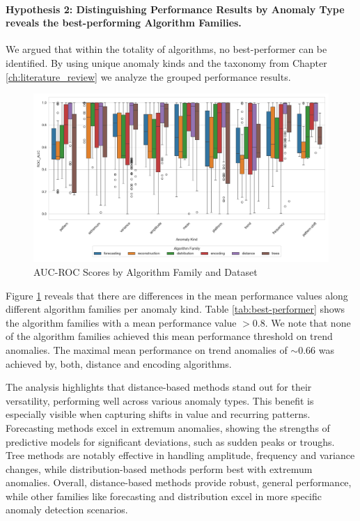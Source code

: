

\paragraph{Hypothesis 2: Distinguishing Performance Results by Anomaly Type reveals the best-performing Algorithm Families.}
We argued that within the totality of algorithms, no best-performer can be identified. By using unique anomaly kinds and the taxonomy from Chapter \ref{ch:literature_review} we analyze the grouped performance results.

\begin{figure}
    \centering
    \includegraphics[width=1\textwidth]{plots/h1_boxplot_results.png}
    \caption{AUC-ROC Scores by Algorithm Family and Dataset}
    \label{fig:h1_boxplot_results}
\end{figure}



Figure \ref{fig:h1_boxplot_results} reveals that there are differences in the mean performance values along different algorithm families per anomaly kind. Table \ref{tab:best-performer} shows the algorithm families with a mean performance value $>0.8$. We note that none of the algorithm families achieved this mean performance threshold on trend anomalies. The maximal mean performance on trend anomalies of $\sim 0.66$ was achieved by, both, distance and encoding algorithms.

The analysis highlights that distance-based methods stand out for their versatility, performing well across various anomaly types. This benefit is especially visible when capturing shifts in value and recurring patterns. 
Forecasting methods excel in extremum anomalies, showing the strengths of predictive models for significant deviations, such as sudden peaks or troughs. 
Tree methods are notably effective in handling amplitude, frequency and variance changes, while distribution-based methods perform best with extremum anomalies. Overall, distance-based methods provide robust, general performance, while other families like forecasting and distribution excel in more specific anomaly detection scenarios.

